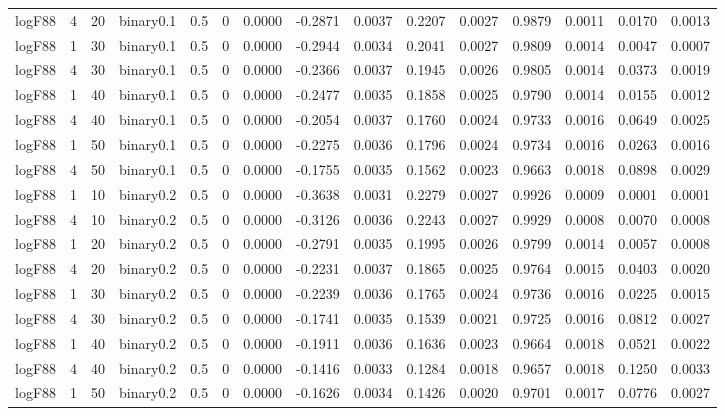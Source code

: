 \begin{longtable}{rrrrrrrrrrrrrrr}
  logF88 & 4 & 20 & binary0.1 & 0.5 & 0 & 0.0000 & -0.2871 & 0.0037 & 0.2207 & 0.0027 & 0.9879 & 0.0011 & 0.0170 & 0.0013 \\ 
  logF88 & 1 & 30 & binary0.1 & 0.5 & 0 & 0.0000 & -0.2944 & 0.0034 & 0.2041 & 0.0027 & 0.9809 & 0.0014 & 0.0047 & 0.0007 \\ 
  logF88 & 4 & 30 & binary0.1 & 0.5 & 0 & 0.0000 & -0.2366 & 0.0037 & 0.1945 & 0.0026 & 0.9805 & 0.0014 & 0.0373 & 0.0019 \\ 
  logF88 & 1 & 40 & binary0.1 & 0.5 & 0 & 0.0000 & -0.2477 & 0.0035 & 0.1858 & 0.0025 & 0.9790 & 0.0014 & 0.0155 & 0.0012 \\ 
  logF88 & 4 & 40 & binary0.1 & 0.5 & 0 & 0.0000 & -0.2054 & 0.0037 & 0.1760 & 0.0024 & 0.9733 & 0.0016 & 0.0649 & 0.0025 \\ 
  logF88 & 1 & 50 & binary0.1 & 0.5 & 0 & 0.0000 & -0.2275 & 0.0036 & 0.1796 & 0.0024 & 0.9734 & 0.0016 & 0.0263 & 0.0016 \\ 
  logF88 & 4 & 50 & binary0.1 & 0.5 & 0 & 0.0000 & -0.1755 & 0.0035 & 0.1562 & 0.0023 & 0.9663 & 0.0018 & 0.0898 & 0.0029 \\ 
  logF88 & 1 & 10 & binary0.2 & 0.5 & 0 & 0.0000 & -0.3638 & 0.0031 & 0.2279 & 0.0027 & 0.9926 & 0.0009 & 0.0001 & 0.0001 \\ 
  logF88 & 4 & 10 & binary0.2 & 0.5 & 0 & 0.0000 & -0.3126 & 0.0036 & 0.2243 & 0.0027 & 0.9929 & 0.0008 & 0.0070 & 0.0008 \\ 
  logF88 & 1 & 20 & binary0.2 & 0.5 & 0 & 0.0000 & -0.2791 & 0.0035 & 0.1995 & 0.0026 & 0.9799 & 0.0014 & 0.0057 & 0.0008 \\ 
  logF88 & 4 & 20 & binary0.2 & 0.5 & 0 & 0.0000 & -0.2231 & 0.0037 & 0.1865 & 0.0025 & 0.9764 & 0.0015 & 0.0403 & 0.0020 \\ 
  logF88 & 1 & 30 & binary0.2 & 0.5 & 0 & 0.0000 & -0.2239 & 0.0036 & 0.1765 & 0.0024 & 0.9736 & 0.0016 & 0.0225 & 0.0015 \\ 
  logF88 & 4 & 30 & binary0.2 & 0.5 & 0 & 0.0000 & -0.1741 & 0.0035 & 0.1539 & 0.0021 & 0.9725 & 0.0016 & 0.0812 & 0.0027 \\ 
  logF88 & 1 & 40 & binary0.2 & 0.5 & 0 & 0.0000 & -0.1911 & 0.0036 & 0.1636 & 0.0023 & 0.9664 & 0.0018 & 0.0521 & 0.0022 \\ 
  logF88 & 4 & 40 & binary0.2 & 0.5 & 0 & 0.0000 & -0.1416 & 0.0033 & 0.1284 & 0.0018 & 0.9657 & 0.0018 & 0.1250 & 0.0033 \\ 
  logF88 & 1 & 50 & binary0.2 & 0.5 & 0 & 0.0000 & -0.1626 & 0.0034 & 0.1426 & 0.0020 & 0.9701 & 0.0017 & 0.0776 & 0.0027 \\ 

\end{longtable}
